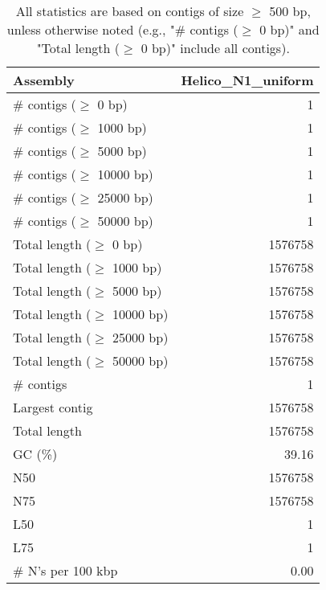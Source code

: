 \documentclass[12pt,a4paper]{article}
\begin{document}
\begin{table}[ht]
\begin{center}
\caption{All statistics are based on contigs of size $\geq$ 500 bp, unless otherwise noted (e.g., "\# contigs ($\geq$ 0 bp)" and "Total length ($\geq$ 0 bp)" include all contigs).}
\begin{tabular}{|l*{1}{|r}|}
\hline
Assembly & Helico\_N1\_uniform \\ \hline
\# contigs ($\geq$ 0 bp) & 1 \\ \hline
\# contigs ($\geq$ 1000 bp) & 1 \\ \hline
\# contigs ($\geq$ 5000 bp) & 1 \\ \hline
\# contigs ($\geq$ 10000 bp) & 1 \\ \hline
\# contigs ($\geq$ 25000 bp) & 1 \\ \hline
\# contigs ($\geq$ 50000 bp) & 1 \\ \hline
Total length ($\geq$ 0 bp) & 1576758 \\ \hline
Total length ($\geq$ 1000 bp) & 1576758 \\ \hline
Total length ($\geq$ 5000 bp) & 1576758 \\ \hline
Total length ($\geq$ 10000 bp) & 1576758 \\ \hline
Total length ($\geq$ 25000 bp) & 1576758 \\ \hline
Total length ($\geq$ 50000 bp) & 1576758 \\ \hline
\# contigs & 1 \\ \hline
Largest contig & 1576758 \\ \hline
Total length & 1576758 \\ \hline
GC (\%) & 39.16 \\ \hline
N50 & 1576758 \\ \hline
N75 & 1576758 \\ \hline
L50 & 1 \\ \hline
L75 & 1 \\ \hline
\# N's per 100 kbp & 0.00 \\ \hline
\end{tabular}
\end{center}
\end{table}
\end{document}
